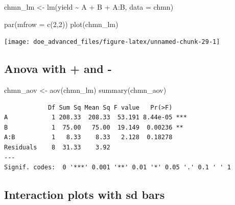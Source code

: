 \documentclass[
]{book}
\newenvironment{Shaded}{\begin{snugshade}}{\end{snugshade}}
\newcommand{\AttributeTok}[1]{\textcolor[rgb]{0.77,0.63,0.00}{#1}}
\newcommand{\DecValTok}[1]{\textcolor[rgb]{0.00,0.00,0.81}{#1}}
\newcommand{\FunctionTok}[1]{\textcolor[rgb]{0.00,0.00,0.00}{#1}}
\newcommand{\NormalTok}[1]{#1}
\newcommand{\OtherTok}[1]{\textcolor[rgb]{0.56,0.35,0.01}{#1}}
\newcommand{\SpecialCharTok}[1]{\textcolor[rgb]{0.00,0.00,0.00}{#1}}
\begin{document}
\begin{Shaded}
\begin{Highlighting}[]
\NormalTok{chmn\_lm }\OtherTok{\textless{}{-}} \FunctionTok{lm}\NormalTok{(yield }\SpecialCharTok{\textasciitilde{}}\NormalTok{ A }\SpecialCharTok{+}\NormalTok{ B }\SpecialCharTok{+}\NormalTok{ A}\SpecialCharTok{:}\NormalTok{B, }\AttributeTok{data =}\NormalTok{ chmn)}
\end{Highlighting}
\end{Shaded}

\begin{Shaded}
\begin{Highlighting}[]
\FunctionTok{par}\NormalTok{(}\AttributeTok{mfrow =} \FunctionTok{c}\NormalTok{(}\DecValTok{2}\NormalTok{,}\DecValTok{2}\NormalTok{))}
\FunctionTok{plot}\NormalTok{(chmn\_lm)}
\end{Highlighting}
\end{Shaded}

\texttt{[image: doe\_advanced\_files/figure-latex/unnamed-chunk-29-1]}

\hypertarget{anova-with-and--}{%
\subsection{Anova with + and -}\label{anova-with-and--}}

\begin{Shaded}
\begin{Highlighting}[]
\NormalTok{chmn\_aov }\OtherTok{\textless{}{-}} \FunctionTok{aov}\NormalTok{(chmn\_lm)}
\FunctionTok{summary}\NormalTok{(chmn\_aov)}
\end{Highlighting}
\end{Shaded}

\begin{verbatim}
            Df Sum Sq Mean Sq F value   Pr(>F)    
A            1 208.33  208.33  53.191 8.44e-05 ***
B            1  75.00   75.00  19.149  0.00236 ** 
A:B          1   8.33    8.33   2.128  0.18278    
Residuals    8  31.33    3.92                     
---
Signif. codes:  0 '***' 0.001 '**' 0.01 '*' 0.05 '.' 0.1 ' ' 1
\end{verbatim}

\hypertarget{interaction-plots-with-sd-bars}{%
\subsection{Interaction plots with sd bars}\label{interaction-plots-with-sd-bars}}
\end{document}
